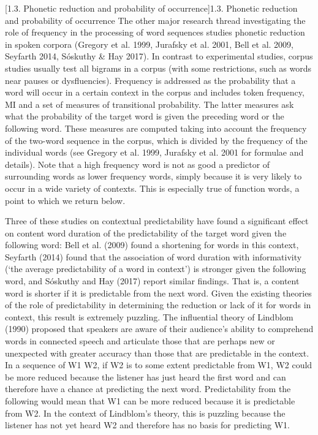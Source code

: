 \documentclass[12pt]{article}
\makeatletter
\renewcommand\subsection{\@startsection{subsection}{2}{0.0cm}{0.222in}{0.0835in}{\normalfont\normalsize\fontsize{16pt}{19.2pt}\selectfont\rmfamily\bfseries\raggedright}}
\newenvironment{styleStandard}{\setlength\leftskip{0cm}\setlength\rightskip{0cm plus 1fil}\setlength\parindent{0cm}\setlength\parfillskip{0pt plus 1fil}\setlength\parskip{0in plus 1pt}\writerlistparindent\writerlistleftskip\leavevmode\normalfont\normalsize\writerlistlabel\ignorespaces}{\unskip\vspace{0.111in plus 0.0111in}\par}
\newcommand\writerlistleftskip{}
\newcommand\writerlistparindent{}
\newcommand\writerlistlabel{}
\makeatother
\begin{document}
\subsection[1.3. Phonetic reduction and probability of occurrence]{1.3. Phonetic reduction and probability of occurrence}
\begin{styleStandard}
The other major research thread investigating the role of frequency in the processing of word sequences studies phonetic reduction in spoken corpora (Gregory et al. 1999, Jurafsky et al. 2001, Bell et al. 2009, Seyfarth 2014, Sóskuthy \& Hay 2017). In contrast to experimental studies, corpus studies usually test all bigrams in a corpus (with some restrictions, such as words near pauses or dysfluencies). Frequency is addressed as the probability that a word will occur in a certain context in the corpus and includes token frequency, MI and a set of measures of transitional probability. The latter measures ask what the probability of the target word is given the preceding word or the following word. These measures are computed taking into account the frequency of the two-word sequence in the corpus, which is divided by the frequency of the individual words (see Gregory et al. 1999, Jurafsky et al. 2001 for formulae and details). Note that a high frequency word is not as good a predictor of surrounding words as lower frequency words, simply because it is very likely to occur in a wide variety of contexts. This is especially true of function words, a point to which we return below. 
\end{styleStandard}

\begin{styleStandard}
Three of these studies on contextual predictability have found a significant effect on content word duration of the predictability of the target word given the following word: Bell et al. (2009) found a shortening for words in this context, Seyfarth (2014) found that the association of word duration with informativity (‘the average predictability of a word in context’) is stronger given the following word, and Sóskuthy and Hay (2017) report similar findings. That is, a content word is shorter if it is predictable from the next word. Given the existing theories of the role of predictability in determining the reduction or lack of it for words in context, this result is extremely puzzling. The influential theory of Lindblom (1990) proposed that speakers are aware of their audience’s ability to comprehend words in connected speech and articulate those that are perhaps new or unexpected with greater accuracy than those that are predictable in the context. In a sequence of W1 W2, if W2 is to some extent predictable from W1, W2 could be more reduced because the listener has just heard the first word and can therefore have a chance at predicting the next word. Predictability from the following would mean that W1 can be more reduced because it is predictable from W2. In the context of Lindblom’s theory, this is puzzling because the listener has not yet heard W2 and therefore has no basis for predicting W1. 
\end{styleStandard}
\end{document}
